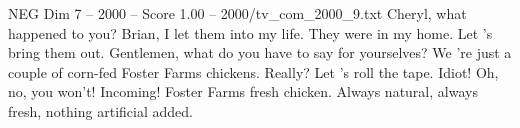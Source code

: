 \begin{textsample}{NEG Dim 7 – 2000 – Score 1.00 – 2000/tv\_com\_2000\_9.txt}  \label{ex:f7_neg_046}
Cheryl, what happened to you?
Brian, I let them into my life.
They were in my home.
Let 's bring them out.
Gentlemen, what do you have to say for yourselves?
We 're just a couple of corn-fed Foster Farms chickens.
Really?
Let 's roll the tape.
Idiot!
Oh, no, you won't!
Incoming!
Foster Farms fresh chicken.
Always natural, always fresh, nothing artificial added.

\end{textsample}
